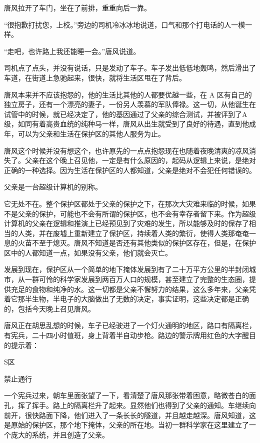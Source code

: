 唐风拉开了车门，坐在了前排，重重向后一靠。

“很抱歉打扰您，上校。”旁边的司机冷冰冰地说道，口气和那个打电话的人一模一样。

“走吧，也许路上我还能睡一会。”唐风说道。

司机点了点头，并没有说话，只是发动了车子。车子发出低低地轰鸣，然后滑出了车道，在街道上急驰起来，很快，就将生活区甩在了背后。

唐风本来并不应该抱怨的，他的生活比其他的人都要优越一些，在 A 区有自己的独立房子，还有一个漂亮的妻子，一份另人羡慕的军队俸禄。这一切，从他诞生在试管中的时候，就已经决定了，他的基因通过了父亲的综合测试，并被评到了A级，如同有着高贵血统的纯种马一样，唐风从出生就受到了良好的待遇，直到他成年，可以为父亲和生活在保护区的其他人服务为止。

唐风这个时候并没有想这个，也许原先的一点点抱怨现在也随着夜晚清爽的凉风消失了。父亲在这个晚上召见他，一定是有什么原因的，起码从逻辑上来说，是绝对正确的一种选择。因为生活在保护区的人都知道，父亲是绝对不会犯任何错误的。

父亲是一台超级计算机的别称。

它无处不在。整个保护区都处于父亲的保护之下，在那次大灾难来临的时候，如果不是父亲的保护，可能也不会有所谓的保护区，也不会有幸存者留下来。作为超级计算机的父亲在逻辑和推演上已经预见到了灾难的发生，所以能够及时的保存了相当的人类，并在废墟上重新建立了保护区，持续着人类的繁衍，使得人类那奄奄一息的火苗不至于熄灭。唐风不知道是否还有其他类似的保护区存在，但是，在保护区中的人都知道一点，如果没有父亲，他们就会灭亡。

发展到现在，保护区从一个简单的地下掩体发展到有了二十万平方公里的半封闭城市，从一群可怜的科学家发展到两百万人口的规模，甚至建立了完整的生态圈，提供充足的食物和纯净的水。这一切都是父亲不懈努力的结果，这么多年来，父亲凭着它那半生物，半电子的大脑做出了无数的决定，事实证明，这些决定都是正确的，包括今天晚上召见唐风。

唐风正在胡思乱想的时候，车子已经驶进了一个灯火通明的地区，路口有隔离栏，有宪兵，二十四小时值班，身上背着半自动步枪。路边的警示牌用红色的大字醒目的提示着：

S区

禁止通行

一个宪兵过来，朝车里面张望了一下，看清楚了唐风那张带着困意，略微苍白的面孔，挥了挥手。路上的隔离栏升了起来。显然他们也得到了父亲的通知。车继续向前开，很快路面下降，他们进入了一条长长的隧道，并且越走越深。唐风知道，这是原始的保护区，那个地下掩体，父亲的所在地。当初一群科学家在这里建立了一个庞大的系统，并且创造了父亲。

